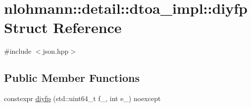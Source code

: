 \hypertarget{structnlohmann_1_1detail_1_1dtoa__impl_1_1diyfp}{}\section{nlohmann\+::detail\+::dtoa\+\_\+impl\+::diyfp Struct Reference}
\label{structnlohmann_1_1detail_1_1dtoa__impl_1_1diyfp}


{\ttfamily \#include $<$json.\+hpp$>$}

\subsection*{Public Member Functions}
\begin{DoxyCompactItemize}
\item 
constexpr \mbox{\hyperlink{structnlohmann_1_1detail_1_1dtoa__impl_1_1diyfp_ad8798a8823a49c8412f0fada9892c918}{diyfp}} (std\+::uint64\+\_\+t f\+\_\+, int e\+\_\+) noexcept
\end{DoxyCompactItemize}
